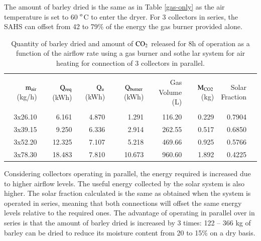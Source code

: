 The amount of barley dried is the same as in Table \ref{gas-only} as the air temperature is set to 60 $^{\rm{o}}$C to enter the dryer. For 3 collectors in series, the SAHS can offset from 42 to 79\% of the energy the gas burner provided alone. 

\begin{table}[h]
	\caption{Quantity of barley dried and amount of $\rm{CO_2}$ released for 8h of operation as a function of the airflow rate using a gas burner and sothe lar system for air heating for connection of 3 collectors in parallel.}
	\centering
	
	\begin{tabular}{rrrrrrrr}
		\hline \\ [-10pt]
		\makecell{$\rm{m_{air}}$ \\ (kg/h)} & \makecell{$\rm{Q_{req}}$ \\ (kWh)} & 	\makecell{$\rm{Q_{u}}$ \\ (kWh)} & 	\makecell{$\rm{Q_{burner}}$  \\ (kWh)} & \makecell{Gas Volume \\ (L)} & \makecell{$\rm{M_{CO2}}$  \\ (kg)} & \makecell{Solar \\ Fraction} \\
		\hline \\ [-10pt]
		3x26.10 & 6.161 & 4.870 & 1.291 & 116.20 & 0.229 & 0.7904 \\ [2pt]
		3x39.15 & 9.250 & 6.336 & 2.914 & 262.55 & 0.517 & 0.6850 \\ [2pt]
		3x52.20 & 12.325 & 7.107 & 5.218 & 469.66 & 0.925 & 0.5766 \\ [2pt]
		3x78.30 & 18.483 & 7.810 & 10.673 & 960.60 & 1.892 & 0.4225 \\ 
		\hline
	\end{tabular}
	
	\label{gas-solar-parallel}
\end{table}

\newpage
Considering collectors operating in parallel, the energy required is increased due to higher airflow levels. The useful energy collected by the solar system is also higher. The solar fraction calculated is the same as obtained when the system is operated in series, meaning that both connections will offset the same energy levels relative to the required ones. The advantage of operating in parallel over in series is that the amount of barley dried is increased by 3 times: 122 -- 366 kg of barley can be dried to reduce its moisture content from 20 to 15\% on a dry basis.




